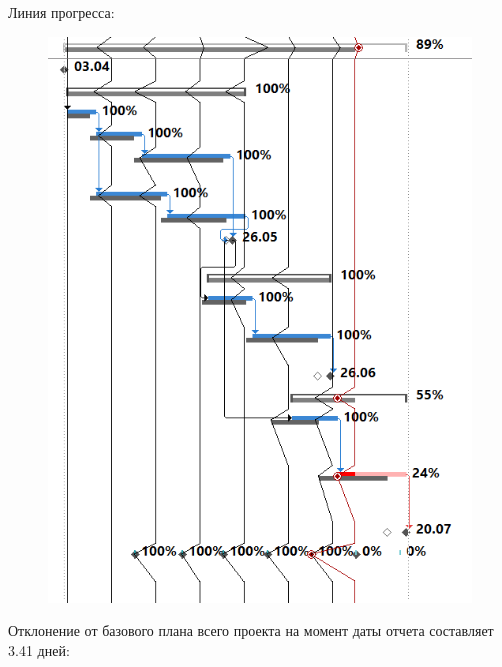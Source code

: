Линия прогресса:

\begin{figure}[H]
	\begin{center}
		\includegraphics[width=\textwidth]{imgs/task_10_8.png}
	\end{center}
\end{figure}

Отклонение от базового плана всего проекта на момент даты отчета составляет 3.41 дней:


